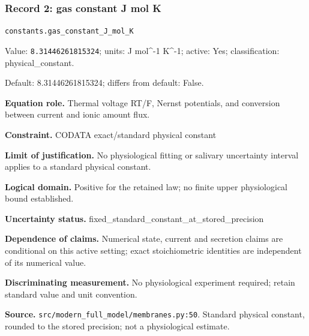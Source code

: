 \subsubsection*{Record 2: gas constant J mol K}
{\small \nolinkurl{constants.gas_constant_J_mol_K}\par

Value: \texttt{8.31446261815324}; units: J mol\textasciicircum{}-1 K\textasciicircum{}-1; active: Yes; classification: physical\_constant.\par

Default: 8.31446261815324; differs from default: False.\par

\textbf{Equation role.} Thermal voltage RT/F, Nernst potentials, and conversion between current and ionic amount flux.\par

\textbf{Constraint.} CODATA exact/standard physical constant\par

\textbf{Limit of justification.} No physiological fitting or salivary uncertainty interval applies to a standard physical constant.\par

\textbf{Logical domain.} Positive for the retained law; no finite upper physiological bound established.\par

\textbf{Uncertainty status.} fixed\_standard\_constant\_at\_stored\_precision\par

\textbf{Dependence of claims.} Numerical state, current and secretion claims are conditional on this active setting; exact stoichiometric identities are independent of its numerical value.\par

\textbf{Discriminating measurement.} No physiological experiment required; retain standard value and unit convention.\par

\textbf{Source.} \nolinkurl{src/modern_full_model/membranes.py:50}. Standard physical constant, rounded to the stored precision; not a physiological estimate.\par}

